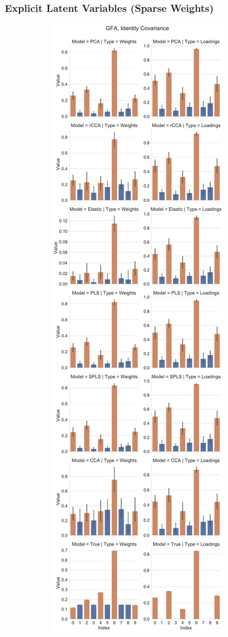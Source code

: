 \subsubsection{Explicit Latent Variables (Sparse Weights)}


\begin{figure}
    \centering
    \begin{subfigure}{0.49\linewidth}
        \centering
        \includegraphics[width=\linewidth]{figures/simulated/low/Combined_Weights_Loadings_with_Error_Bars_Identity_Covariance_explicit}

\end{subfigure}
\end{figure}

